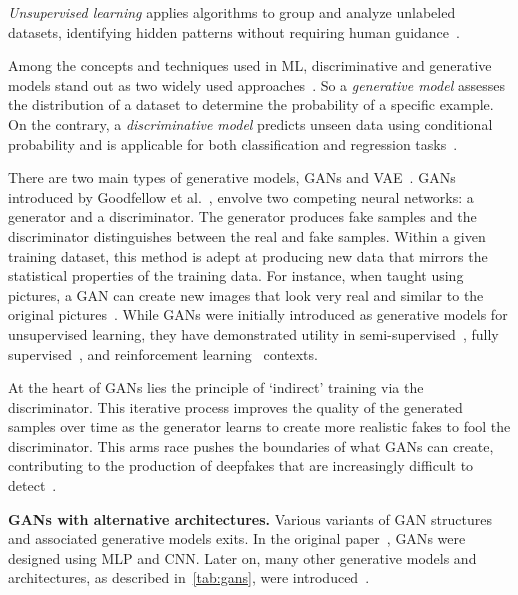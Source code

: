 \textit{Unsupervised learning} applies algorithms to group and analyze unlabeled datasets,
identifying hidden patterns without requiring human guidance~\cite{supervised-unsupervised}.

Among the concepts and techniques used in \ac{ML}, discriminative and generative models stand out
as two widely used approaches~\cite{generative-discriminative}. So a \textit{generative model}
assesses the distribution of a dataset to determine the probability of a specific example. On the
contrary, a \textit{discriminative model} predicts unseen data using conditional probability
and is applicable for both classification and regression tasks~\cite{generative-discriminative2}.

There are two main types of generative models, \ac{GAN}s and \ac{VAE}~\cite{generative-discriminative}. \ac{GAN}s
introduced by Goodfellow et al.~\cite{goodfellow2014generative}, envolve two
competing neural networks: a generator and a discriminator. The generator produces
fake samples and the discriminator distinguishes between the real and fake samples.
Within a given training dataset, this method is adept at producing new data that mirrors the
statistical properties of the training data. For instance, when taught using pictures, a \ac{GAN}
can create new images that look very real and similar to the original pictures~\cite{enwiki:1169846514}.
While \ac{GAN}s were initially introduced as generative models for unsupervised learning,
they have demonstrated utility in semi-supervised~\cite{salimans2016improved},
fully supervised~\cite{pix2pix2017}, and reinforcement learning~\cite{ho2016generative} contexts.

At the heart of \ac{GAN}s lies the principle of `indirect' training via the discriminator.
This iterative process improves the quality of the generated samples over time as
the generator learns to create more realistic fakes to fool the discriminator. This
arms race pushes the boundaries of what \ac{GAN}s can create, contributing to the
production of deepfakes that are increasingly difficult to detect~\cite{brock2019large}.

\textbf{\ac{GAN}s with alternative architectures.} Various variants of \ac{GAN} structures
and associated generative models exits. In the original paper~\cite{goodfellow2014generative},
\ac{GAN}s were designed using \ac{MLP} and \ac{CNN}. Later on, many other generative models and
architectures, as described in~\autoref{tab:gans}, were introduced~\cite{gans-versions}.

